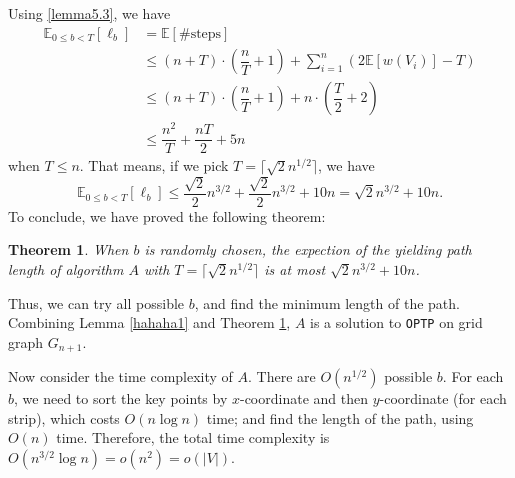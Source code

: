 \documentclass[11pt]{article}
\theoremstyle{plain}
\newtheorem{theorem}{Theorem}[section]
\begin{document}
Using \ref{lemma5.3}, we have
\begin{align*}
\mathbb{E}_{0\le b<T}[\ell_b] &= \mathbb{E}[\#\text{steps}]\\
&\le (n+T)\cdot \left(\dfrac{n}{T}+1\right)+\sum\limits_{i=1}^n (2\mathbb{E}[w(V_i)]-T)\\
&\le (n+T)\cdot \left(\dfrac{n}{T}+1\right) + n\cdot \left(\dfrac{T}{2}+2\right)\\
&\le \dfrac{n^2}{T}+\dfrac{nT}{2}+5n
\end{align*}
when $T\le n$. That means, if we pick $T=\lceil\sqrt{2}n^{1/2}\rceil$, we have
$$\mathbb{E}_{0\le b<T}[\ell_b]\le \dfrac{\sqrt{2}}{2}n^{3/2}+\dfrac{\sqrt{2}}{2}n^{3/2}+10n = \sqrt{2}n^{3/2}+10n.$$
To conclude, we have proved the following theorem:
\begin{theorem}
    \label{theo5.1}
When $b$ is randomly chosen, the expection of the yielding path length of algorithm $A$ with $T=\lceil\sqrt{2}n^{1/2}\rceil$ is at most $\sqrt{2}n^{3/2}+10n$.
\end{theorem}

Thus, we can try all possible $b$, and find the minimum length of the path. Combining Lemma \ref{hahaha1} and Theorem \ref{theo5.1}, $A$ is a solution to \texttt{OPTP} on grid graph $G_{n+1}$.

Now consider the time complexity of $A$. There are $O(n^{1/2})$ possible $b$. For each $b$, we need to sort the key points by $x$-coordinate and then $y$-coordinate (for each strip), which costs $O(n\log n)$ time; and find the length of the path, using $O(n)$ time. Therefore, the total time complexity is $O(n^{3/2}\log n)=o(n^2)=o(|V|)$.

\end{document}
